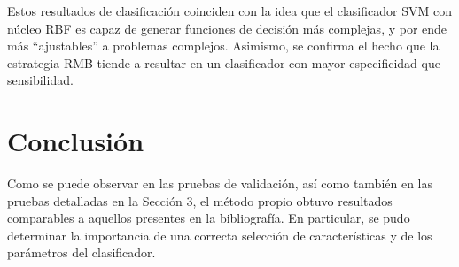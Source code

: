 Estos resultados de clasificación coinciden con la idea que el
clasificador SVM con núcleo RBF es capaz de generar funciones de
decisión más complejas, y por ende más ``ajustables'' a problemas
complejos. Asimismo, se confirma el hecho que la estrategia RMB tiende
a resultar en un clasificador con mayor especificidad que
sensibilidad.

\chapter{Conclusión}
Como se puede observar en las pruebas de validación,
así como también en las pruebas detalladas en la Sección 3,
el método propio obtuvo resultados comparables
a aquellos presentes en la bibliografía.
En particular, se pudo determinar la importancia de una correcta
selección de características y de los parámetros del clasificador.
